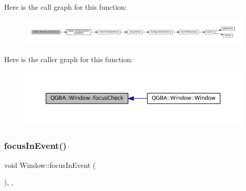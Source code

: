 Here is the call graph for this function\+:
\nopagebreak
\begin{figure}[H]
\begin{center}
\leavevmode
\includegraphics[width=350pt]{class_q_g_b_a_1_1_window_a39a941c33d3f50cbb26819448366578d_cgraph}
\end{center}
\end{figure}
Here is the caller graph for this function\+:
\nopagebreak
\begin{figure}[H]
\begin{center}
\leavevmode
\includegraphics[width=350pt]{class_q_g_b_a_1_1_window_a39a941c33d3f50cbb26819448366578d_icgraph}
\end{center}
\end{figure}
\mbox{\label{class_q_g_b_a_1_1_window_a1757fad68d968a3e29494778672e3815}} 
\subsubsection{\texorpdfstring{focus\+In\+Event()}{focusInEvent()}}
{\footnotesize\ttfamily void Window\+::focus\+In\+Event (\begin{DoxyParamCaption}\item[{Q\+Focus\+Event $\ast$}]{ }\end{DoxyParamCaption})\hspace{0.3cm}{\ttfamily [override]}, {\ttfamily [protected]}, {\ttfamily [virtual]}}

\mbox{\label{class_q_g_b_a_1_1_window_a5d8cd182b94491e972b174228aab3d6a}} 
